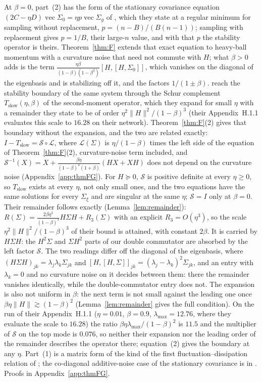 \documentclass[11pt]{article}
\theoremstyle{remark}
\begin{document}
At $\beta=0$, part~(2) has the form of the stationary covariance equation $(2C-\eta D)\operatorname{vec}\Sigma_0=\eta p\operatorname{vec}\Sigma_g$ of \citet[Theorem~12]{mulayoff2024exact}, which they state at a regular minimum for sampling without replacement, $p=(n-B)/(B(n-1))$; sampling with replacement gives $p=1/B$, their large-$n$ value, and with that $p$ the stability operator is theirs. Theorem~\ref{thm:F} extends that exact equation to heavy-ball momentum with a curvature noise that need not commute with $H$; what $\beta>0$ adds is the term $\frac{\eta\beta}{(1-\beta)(1-\beta^2)}[H,[H,\Sigma_0]]$, which vanishes on the diagonal of the eigenbasis and is stabilizing off it, and the factors $1/(1\pm\beta)$. \citet[Appendix~D]{andreyev2026momentum} reach the stability boundary of the same system through the Schur complement $T_{\mathrm{slow}}(\eta,\beta)$ of the second-moment operator, which they expand for small $\eta$ with a remainder they state to be of order $\eta^2\|H\|^2/(1-\beta)^3$ (their Appendix~H.1.1 evaluates this scale to $16.28$ on their network). Theorem~\ref{thm:F}(2) gives that boundary without the expansion, and the two are related exactly: $I-T_{\mathrm{slow}}=\mathcal S\circ\mathcal L$, where $\mathcal L(\Sigma)$ is $\eta/(1-\beta)$ times the left side of the equation of Theorem~\ref{thm:F}(2), curvature-noise term included, and $\mathcal S^{-1}(X)=X+\frac{\beta\eta}{(1-\beta)^2(1+\beta)}(HX+XH)$ does not depend on the curvature noise (Appendix~\ref{app:thmFG}). For $H\succeq0$, $\mathcal S$ is positive definite at every $\eta\ge0$, so $T_{\mathrm{slow}}$ exists at every $\eta$, not only small ones, and the two equations have the same solutions for every $\Sigma_\xi$ and are singular at the same $\eta$; $\mathcal S=I$ only at $\beta=0$. Their remainder follows exactly (Lemma~\ref{lem:remainder}): $R(\Sigma)=\frac{2\beta\eta^2}{(1-\beta)^3}H\Sigma H+R_3(\Sigma)$ with an explicit $R_3=O(\eta^3)$, so the scale $\eta^2\|H\|^2/(1-\beta)^3$ of their bound is attained, with constant $2\beta$. It is carried by $H\Sigma H$: the $H^2\Sigma$ and $\Sigma H^2$ parts of our double commutator are absorbed by the left factor $\mathcal S$. The two readings differ off the diagonal of the eigenbasis, where $(H\Sigma H)_{jk}=\lambda_j\lambda_k\Sigma_{jk}$ and $[H,[H,\Sigma]]_{jk}=(\lambda_j-\lambda_k)^2\Sigma_{jk}$, and an entry with $\lambda_k=0$ and no curvature noise on it decides between them: there the remainder vanishes identically, while the double-commutator entry does not. The expansion is also not uniform in $\beta$: the next term is not small against the leading one once $\beta\eta\|H\|\gtrsim(1-\beta)^2$ (Lemma~\ref{lem:remainder} gives the full condition). On the run of their Appendix~H.1.1 ($\eta=0.01$, $\beta=0.9$, $\lambda_{\max}=12.76$, where they evaluate the scale to $16.28$) the ratio $\beta\eta\lambda_{\max}/(1-\beta)^2$ is $11.5$ and the multiplier of $\mathcal S$ on the top mode is $0.076$, so neither their expansion nor the leading order of the remainder describes the operator there; equation~(2) gives the boundary at any $\eta$. Part~(1) is a matrix form of the kind of the first fluctuation--dissipation relation of \citet{yaida2019}; the co-diagonal additive-noise case of the stationary covariance is in \citet{gitman2019momentum}. Proofs in Appendix~\ref{app:thmFG}.
\end{document}
